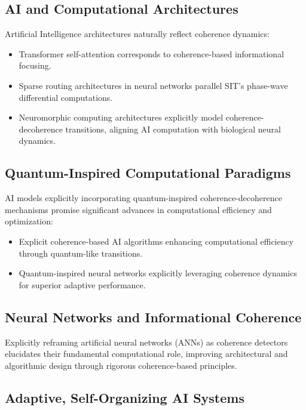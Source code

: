 \documentclass[american,11pt,letterpaper]{article}
\begin{document}
\subsection{AI and Computational Architectures}

Artificial Intelligence architectures naturally reflect coherence dynamics:
\begin{itemize}
\item Transformer self-attention corresponds to coherence-based informational focusing.
\item Sparse routing architectures in neural networks parallel SIT's phase-wave differential computations.
\item Neuromorphic computing architectures explicitly model coherence-decoherence transitions, aligning AI computation with biological neural dynamics.
\end{itemize}

\subsection{Quantum-Inspired Computational Paradigms}

AI models explicitly incorporating quantum-inspired coherence-decoherence mechanisms promise significant advances in computational efficiency and optimization:

\begin{itemize}
\item Explicit coherence-based AI algorithms enhancing computational efficiency through quantum-like transitions.
\item Quantum-inspired neural networks explicitly leveraging coherence dynamics for superior adaptive performance.
\end{itemize}

\subsection{Neural Networks and Informational Coherence}

Explicitly reframing artificial neural networks (ANNs) as coherence detectors elucidates their fundamental computational role, improving architectural and algorithmic design through rigorous coherence-based principles.

\subsection{Adaptive, Self-Organizing AI Systems}
\end{document}
